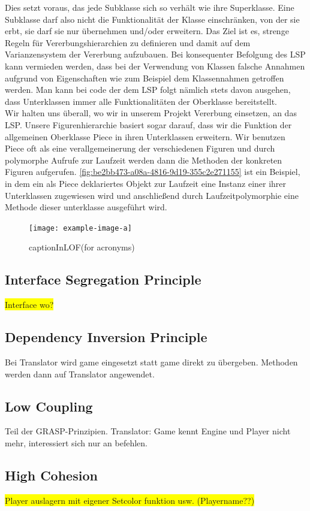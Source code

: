 \documentclass[
10pt, %
a4paper, %
oneside, %
headinclude,footinclude, %
BCOR5mm, %
]{scrartcl}
\begin{document}
\begin{onehalfspace}
Dies setzt voraus, das jede Subklasse sich so verhält wie ihre Superklasse. Eine Subklasse darf also nicht die Funktionalität der Klasse einschränken, von der sie erbt, sie darf sie nur übernehmen und/oder erweitern. Das Ziel ist es, strenge Regeln für Vererbungshierarchien zu definieren und damit auf dem Varianzensystem der Vererbung aufzubauen. Bei konsequenter Befolgung des LSP kann vermieden werden, dass bei der Verwendung von Klassen falsche Annahmen aufgrund von Eigenschaften wie zum Beispiel dem Klassennahmen getroffen werden. Man kann bei code der dem LSP folgt nämlich stets davon ausgehen, dass Unterklassen immer alle Funktionalitäten der Oberklasse bereitstellt.
\\
Wir halten uns überall, wo wir in unserem Projekt Vererbung einsetzen, an das LSP. Unsere Figurenhierarchie basiert sogar darauf, dass wir die Funktion der allgemeinen Oberklasse Piece in ihren Unterklassen erweitern. Wir benutzen Piece oft als eine verallgemeinerung der verschiedenen Figuren und durch polymorphe Aufrufe zur Laufzeit werden dann die Methoden der konkreten Figuren aufgerufen. \autoref{fig:be2bb473-a08a-4816-9d19-355c2e271155} ist ein Beispiel, in dem ein als Piece deklariertes Objekt zur Laufzeit eine Instanz einer ihrer Unterklassen zugewiesen wird und anschließend durch Laufzeitpolymorphie eine Methode dieser unterklasse ausgeführt wird.

\begin{figure}[ht]
	\texttt{[image: example-image-a]}
	\caption[captionInLOF(for acronyms)]{captionInLOF(for acronyms)}
	\label{fig:be2bb473-a08a-4816-9d19-355c2e271155}
\end{figure}
\subsection{Interface Segregation Principle}
\colorbox{yellow}{Interface wo?}
\subsection{Dependency Inversion Principle}
Bei Translator wird game eingesetzt statt game direkt zu übergeben. Methoden werden dann auf Translator angewendet.
\subsection{Low Coupling}
Teil der GRASP-Prinzipien.
Translator: Game kennt Engine und Player nicht mehr, interessiert sich nur an befehlen.
\subsection{High Cohesion}
\colorbox{yellow}{Player auslagern mit eigener Setcolor funktion usw. (Playername??)}


\end{onehalfspace}
\end{document}
